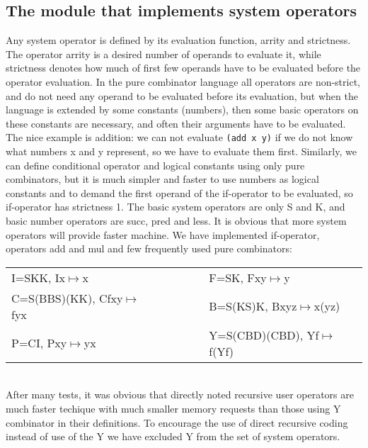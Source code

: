 \documentclass{article}
\begin{document}
\subsection{The module that implements system operators}
Any system operator is defined by its evaluation function, arrity and
strictness. The operator arrity is a desired number of operands to
evaluate it, while strictness denotes how much of first few operands
have to be evaluated before the operator evaluation. In the pure
combinator language all operators are non-strict, and do not need any
operand to be evaluated before its evaluation, but when the language
is extended by some constants (numbers), then some basic operators on
these constants are necessary, and often their arguments have to be
evaluated. The nice example is addition: we can not evaluate
{\tt(add x y)} if we do not know what numbers x and y represent, so we
have to evaluate them first. Similarly, we can define conditional
operator and logical constants using only pure combinators, but it is
much simpler and faster to use numbers as logical constants and to
demand the first operand of the if-operator to be evaluated, so
if-operator has strictness 1. The basic system operators are only S
and K, and basic number operators are succ, pred and less. It is
obvious that more system operators will provide faster machine. We
have implemented if-operator, operators add and mul and few frequently
used pure combinators:
\vspace{2ex}\\
\begin{tabular}{lll}
I=SKK, Ix$\mapsto$x   &~~~~~~  & F=SK, Fxy$\mapsto$y \\
C=S(BBS)(KK), Cfxy$\mapsto$fyx & & B=S(KS)K, Bxyz$\mapsto$x(yz) \\
P=CI, Pxy$\mapsto$yx &\verb+      + & Y=S(CBD)(CBD), Yf$\mapsto$f(Yf)
\end{tabular}
\vspace{2ex}\\
After many tests, it was obvious that directly noted recursive user
operators are much faster techique with much smaller memory requests
than those using Y combinator in their definitions. To encourage the use
of direct recursive coding instead of use of the Y we have excluded Y
from the set of system operators.
\end{document}
